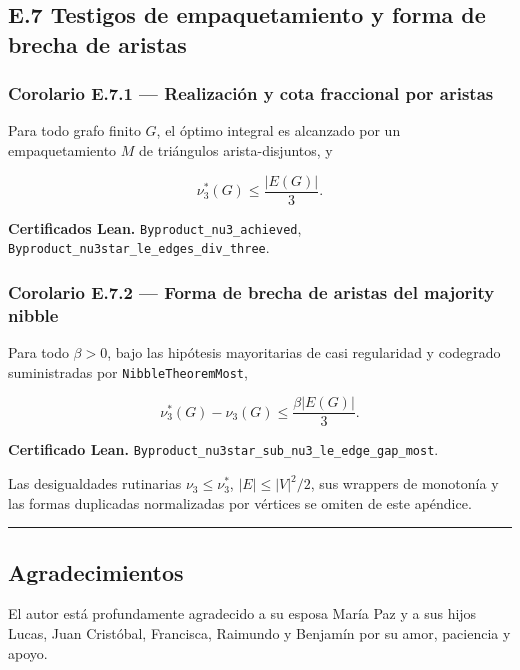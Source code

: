 \documentclass[
  spanish,
  11pt,
  a4paper,
]{article}
\begin{document}
\subsection{E.7 Testigos de empaquetamiento y forma de brecha de aristas}\label{e.7-testigos-de-empaquetamiento-y-forma-de-brecha-de-aristas}

\subsubsection{Corolario E.7.1 --- Realización y cota fraccional por aristas}\label{corolario-e.7.1-realizaciuxf3n-y-cota-fraccional-por-aristas}

Para todo grafo finito \(G\), el óptimo integral es alcanzado por un empaquetamiento \(M\) de triángulos arista-disjuntos, y

\[\nu_3^*(G)\le\frac{|E(G)|}{3}.\]

\textbf{Certificados Lean.} \texttt{Byproduct\_nu3\_achieved}, \texttt{Byproduct\_nu3star\_le\_edges\_div\_three}.

\subsubsection{Corolario E.7.2 --- Forma de brecha de aristas del majority nibble}\label{corolario-e.7.2-forma-de-brecha-de-aristas-del-majority-nibble}

Para todo \(\beta>0\), bajo las hipótesis mayoritarias de casi regularidad y codegrado suministradas por \texttt{NibbleTheoremMost},

\[\nu_3^*(G)-\nu_3(G)\le\frac{\beta|E(G)|}{3}.\]

\textbf{Certificado Lean.} \texttt{Byproduct\_nu3star\_sub\_nu3\_le\_edge\_gap\_most}.

Las desigualdades rutinarias \(\nu_3\le\nu_3^*\), \(|E|\le|V|^2/2\), sus wrappers de monotonía y las formas duplicadas normalizadas por vértices se omiten de este apéndice.

\begin{center}\rule{0.5\linewidth}{0.5pt}\end{center}

\subsection{Agradecimientos}\label{agradecimientos}

El autor está profundamente agradecido a su esposa María Paz y a sus hijos Lucas, Juan Cristóbal, Francisca, Raimundo y Benjamín por su amor, paciencia y apoyo.
\end{document}
